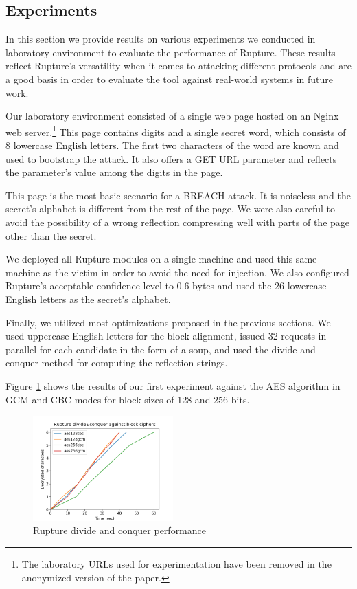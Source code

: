 \subsection{Experiments}\label{subsec:rupture_experiments}

In this section we provide results on various experiments we conducted in
laboratory environment to evaluate the performance of Rupture. These results
reflect Rupture's versatility when it comes to attacking different protocols and
are a good basis in order to evaluate the tool against real-world systems in
future work.

Our laboratory environment consisted of a single web page hosted on an
Nginx web server.\footnote[2]{The laboratory URLs used for experimentation have
been removed in the anonymized version of the paper.} This page contains digits
and a single secret word, which consists of 8 lowercase English letters.
The first two characters of the word are known and used
to bootstrap the attack. It also offers a GET URL parameter and reflects
the parameter's value among the digits in the page.

This page is the most basic scenario for a BREACH attack. It is noiseless and
the secret's alphabet is different from the rest of the page. We were also
careful to avoid the possibility of a wrong reflection compressing well with
parts of the page other than the secret.

We deployed all Rupture modules on a single machine and used this same machine
as the victim in order to avoid the need for injection. We also configured Rupture's
acceptable confidence level to 0.6 bytes and used the 26 lowercase English
letters as the secret's alphabet.

Finally, we utilized most optimizations proposed in the previous sections. We
used uppercase English letters for the block alignment, issued 32 requests
in parallel for each candidate in the form of a soup, and used the
divide and conquer method for computing the reflection strings.

Figure \ref{fig:rupture_performance_div_conq} shows the results of our first
experiment against the AES algorithm in GCM \cite{mcgrew2005galois} and CBC
modes for block sizes of 128 and 256 bits.

   \begin{figure}[thpb]
      \centering
          \includegraphics[width=0.48\textwidth]{experiments/rupture_performance/rupture_div_conq_performance.png}
       \caption{Rupture divide and conquer performance}
      \label{fig:rupture_performance_div_conq}
   \end{figure}

